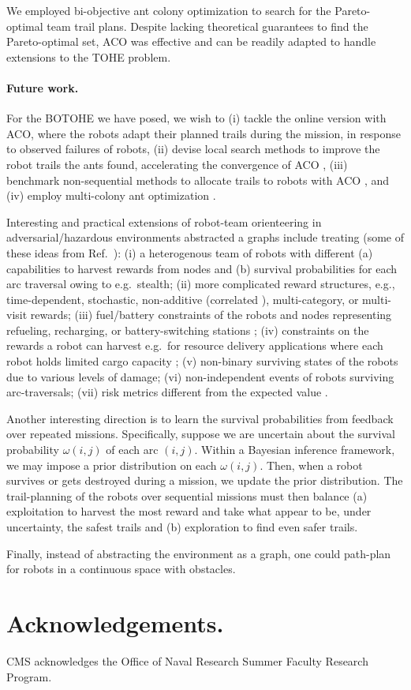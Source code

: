 \documentclass[11pt, oneside]{article}
\begin{document}
We employed bi-objective ant colony optimization to search for the Pareto-optimal team trail plans. Despite lacking theoretical guarantees to find the Pareto-optimal set, ACO was effective and can be readily adapted to handle extensions to the TOHE problem.

\paragraph{Future work.}
For the BOTOHE we have posed, we wish to (i) tackle the online version with ACO, where the robots adapt their planned trails during the mission, in response to observed failures of robots, (ii) devise local search methods to improve the robot trails the ants found, accelerating the convergence of ACO \cite{dorigo2006ant}, (iii) benchmark non-sequential methods to allocate trails to robots with ACO \cite{ke2008ants}, and (iv) employ multi-colony ant optimization \cite{iredi2001bi}.

Interesting and practical extensions of robot-team orienteering in adversarial/hazardous environments abstracted a graphs include treating (some of these ideas from Ref.~\cite{jorgensen2018team}): 
(i) a heterogenous team of robots with different (a) capabilities to harvest rewards from nodes and (b) survival probabilities for each arc traversal owing to e.g.\ stealth;
(ii) more complicated reward structures, e.g., time-dependent, stochastic, non-additive (correlated \cite{yu2014correlated}), multi-category, or multi-visit rewards;
(iii) fuel/battery constraints of the robots and nodes representing refueling, recharging, or battery-switching stations \cite{asghar2023risk,khuller2011fill,liao2016electric}; 
(iv) constraints on the rewards a robot can harvest e.g.\ for resource delivery applications where each robot holds limited cargo capacity \cite{coelho2014thirty};
(v) non-binary surviving states of the robots due to various levels of damage;
(vi) non-independent events of robots surviving arc-traversals;
(vii) risk metrics different from the expected value \cite{majumdar2020should}.

Another interesting direction is to learn the survival probabilities from feedback over repeated missions. 
Specifically, suppose we are uncertain about the survival probability $\omega(i, j)$ of each arc $(i,j)$. Within a Bayesian inference framework, we may impose a prior distribution on each $\omega(i,j)$. Then, when a robot survives or gets destroyed during a mission, we update the prior distribution. 
The trail-planning of the robots over sequential missions must then balance (a) exploitation to harvest the most reward and take what appear to be, under uncertainty, the safest trails and (b) exploration to find even safer trails.

Finally, instead of abstracting the environment as a graph, one could path-plan for robots in a continuous space with obstacles. 

\section*{Acknowledgements.} CMS acknowledges the Office of Naval Research Summer Faculty Research Program.



\end{document}
